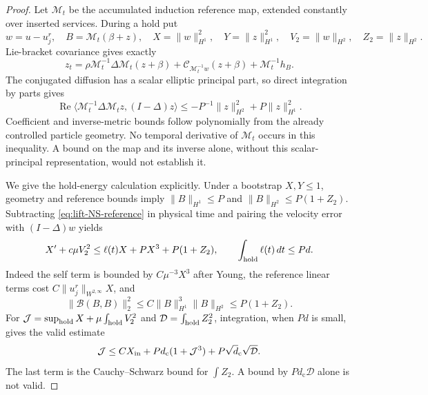\documentclass[11pt,a4paper]{amsart}
\theoremstyle{definition}
\theoremstyle{remark}
\numberwithin{equation}{section}
\newcommand{\Bcal}{\mathcal B}
\newcommand{\Ccal}{\mathcal C}
\newcommand{\Mcal}{\mathcal M}
\newcommand{\ip}[2]{\langle #1,#2\rangle}
\newcommand{\norm}[1]{\lVert #1\rVert}
\DeclareMathOperator{\Rea}{Re}
\begin{document}
\begin{proof}
Let $\Mcal_t$ be the accumulated induction reference map, extended constantly
over inserted services.  During a hold put
\[
 w=u-u_j^r,\quad B=\Mcal_t(\beta+z),\quad
 X=\norm w_{H^1}^2,\quad Y=\norm z_{H^1}^2,\quad
 V_2=\norm w_{H^2},\quad Z_2=\norm z_{H^2}.
\]
Lie-bracket covariance gives exactly
\begin{equation}\label{eq:lift-z-equation}
 z_t=\rho\Mcal_t^{-1}\Delta\Mcal_t(z+\beta)
          +\Ccal_{\Mcal_t^{-1}w}(z+\beta)+\Mcal_t^{-1}h_B.
\end{equation}
The conjugated diffusion has a scalar elliptic principal part, so direct
integration by parts gives
\begin{equation}\label{eq:lift-Garding}
 \Rea\ip{\Mcal_t^{-1}\Delta\Mcal_tz}{(I-\Delta)z}
       \le-P^{-1}\norm z_{H^2}^2+P\norm z_{H^1}^2.
\end{equation}
Coefficient and inverse-metric bounds follow polynomially from the already
controlled particle geometry.  No temporal derivative of $\Mcal_t$ occurs
in this inequality.  A bound on the map and its inverse alone, without this
scalar-principal representation, would not establish it.

We give the hold-energy calculation explicitly.  Under a bootstrap
$X,Y\le1$, geometry and reference bounds imply
$\norm B_{H^1}\le P$ and $\norm B_{H^2}\le P(1+Z_2)$.
Subtracting \eqref{eq:lift-NS-reference} in physical time and pairing the
velocity error with $(I-\Delta)w$ yields
\begin{equation}\label{eq:lift-velocity-energy}
 X'+c\mu V_2^2\le\ell(t)X+PX^3+P(1+Z_2),
 \qquad \int_{\rm hold}\ell(t)\,dt\le Pd.
\end{equation}
Indeed the self term is bounded by $C\mu^{-3}X^3$ after Young, the reference
linear terms cost $C\norm{u_j^r}_{W^{2,\infty}}X$, and
\[
 \norm{\Bcal(B,B)}_2^2
   \le C\norm B_{H^1}^3\norm B_{H^2}\le P(1+Z_2).
\]
For
$\mathcal J=\sup_{\rm hold}X+\mu\int_{\rm hold}V_2^2$ and
$\mathcal D=\int_{\rm hold}Z_2^2$, integration, when $Pd$ is small, gives
the valid estimate
\begin{equation}\label{eq:lift-correct-Lorentz}
 \mathcal J\le C X_{\rm in}+Pd_{\mathrm c}(1+\mathcal J^3)
                         +P\sqrt d_{\mathrm c}\sqrt{\mathcal D}.
\end{equation}
The last term is the Cauchy--Schwarz bound for $\int Z_2$.  A bound by
$Pd_{\mathrm c}\mathcal D$ alone is not valid.


\end{proof}
\end{document}
